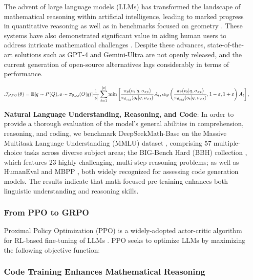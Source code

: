 The advent of large language models (LLMs) has transformed the landscape of mathematical reasoning within artificial intelligence, leading to marked progress in quantitative reasoning \citep{MATH} as well as in benchmarks focused on geometry \citep{trinh2024solving}. These systems have also demonstrated significant value in aiding human users to address intricate mathematical challenges \citep{tao}. Despite these advances, state-of-the-art solutions such as GPT-4 \citep{gpt4} and Gemini-Ultra \citep{gemini} are not openly released, and the current generation of open-source alternatives lags considerably in terms of performance.

\begin{equation}
\footnotesize
                \mathcal{J}_{PPO}(\theta) = \mathbb{E}{[q \sim P(Q), o \sim \pi_{\theta_{old}}(O|q)]} \frac{1}{|o|} \sum_{t=1}^{|o|} \min \left[ \frac{\pi_\theta(o_{t} | q, o_{<t})}{\pi_{\theta_{old}}(o_{t} | q, o_{<t})} A_{t}, \text{clip} \left( \frac{\pi_\theta(o_{t} | q, o_{<t})}{\pi_{\theta_{old}}(o_{t} | q, o_{<t})}, 1 - \varepsilon, 1 + \varepsilon \right)  A_{t} \right] ,
\end{equation}



\item \textbf{Natural Language Understanding, Reasoning, and Code}: In order to provide a thorough evaluation of the model’s general abilities in comprehension, reasoning, and coding, we benchmark DeepSeekMath-Base on the Massive Multitask Language Understanding (MMLU) dataset \citep{mmlu}, comprising 57 multiple-choice tasks across diverse subject areas; the BIG-Bench Hard (BBH) collection \citep{bbh}, which features 23 highly challenging, multi-step reasoning problems; as well as HumanEval \citep{codex} and MBPP \citep{mbpp}, both widely recognized for assessing code generation models. The results indicate that math-focused pre-training enhances both linguistic understanding and reasoning skills.

\subsubsection{From PPO to GRPO} Proximal Policy Optimization (PPO) \citep{schulman2017proximal} is a widely-adopted actor-critic algorithm for RL-based fine-tuning of LLMs \citep{ouyang2022training}. PPO seeks to optimize LLMs by maximizing the following objective function:

\subsubsection{Code Training Enhances Mathematical Reasoning}

